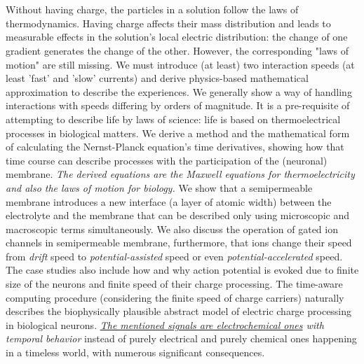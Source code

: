 \section{\label{sec:Physiology-Introduction}}


Without having charge, the particles in a solution follow the laws
of thermodynamics. Having charge affects their mass distribution and
leads to measurable effects in the solution's local electric distribution:
the change of one gradient generates the change of the other. However,
the corresponding "laws of motion" are still missing.
We must
introduce (at least) two interaction speeds (at least 'fast' and 'slow'
currents) and derive physics-based mathematical approximation to describe
the experiences. We generally show a way of handling interactions
with speeds differing by orders of magnitude. It is a pre-requisite
of attempting to describe life by laws of science: life is based on
thermoelectrical processes in biological matters. We derive a method
and the mathematical form of calculating the Nernst-Planck equation's
time derivatives, showing how that time course can describe processes
with the participation of the (neuronal) membrane. \emph{The derived
equations are the Maxwell equations for thermoelectricity and also
the laws of motion for biology.} 
We show that a semipermeable membrane
introduces a new interface (a layer of atomic width) between the electrolyte
and the membrane that can be described only using microscopic and
macroscopic terms simultaneously. We also discuss the operation of
gated ion channels in semipermeable membrane, furthermore, that ions
change their speed from \emph{drift }speed to \emph{potential-assisted}
speed or even \emph{potential-accelerated} speed. The case studies
also include how and why action potential is evoked due to finite
size of the neurons and finite speed of their charge processing. The
time-aware computing procedure (considering the finite speed of charge
carriers) naturally describes the biophysically plausible abstract
model of electric charge processing in biological neurons. 
\textit{\hyperlink{ElectrodiffusionProcesses}{The mentioned signals are electrochemical ones} with temporal behavior}
instead of purely electrical and purely chemical ones
happening in a timeless world, with numerous significant consequences.




